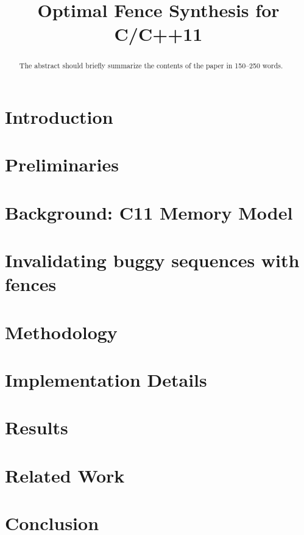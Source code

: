 \documentclass[runningheads]{llncs2e/llncs}
\begin{document}
%
\title{Optimal Fence Synthesis for C/C++11}
%
%
\maketitle              %
%
\begin{abstract}
The abstract should briefly summarize the contents of the paper in
150--250 words.

\end{abstract}
%
%
%
\section{Introduction} \label{sec:intro}


\section{Preliminaries} \label{sec:preliminaries}


\section{Background: C11 Memory Model} \label{sec:c11}


\section{Invalidating buggy sequences with fences} \label{sec:so theory}


\section{Methodology} \label{sec:methodology}


\section{Implementation Details} \label{sec:implementation}


\section{Results} \label{sec:results}


\section{Related Work} \label{sec:related}


\section{Conclusion} \label{sec:conclusion}



\end{document}
